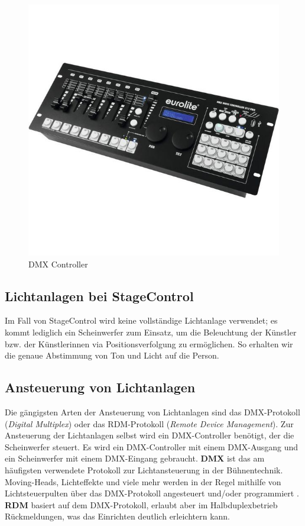 \begin{figure}[H]
	\centering
	\includegraphics[width=0.7\linewidth]{images/DMXController.jpg}
	\caption[DMX Controller]{DMX Controller}
	\label{fig:DMXController}
\end{figure}

\subsection{Lichtanlagen bei StageControl}
Im Fall von StageControl wird keine vollständige Lichtanlage verwendet; es kommt lediglich ein Scheinwerfer zum Einsatz, um die Beleuchtung der Künstler bzw. der Künstlerinnen via Positionsverfolgung zu ermöglichen. So erhalten wir die genaue Abstimmung von Ton und Licht auf die Person.

\newpage
\subsection{Ansteuerung von Lichtanlagen}

Die gängigsten Arten der Ansteuerung von Lichtanlagen sind das DMX-Protokoll (\textit{Digital Multiplex}) oder das RDM-Protokoll (\textit{Remote Device Management}). Zur Ansteuerung der Lichtanlagen selbst wird ein DMX-Controller benötigt, der die Scheinwerfer steuert. Es wird ein DMX-Controller mit einem DMX-Ausgang und ein Scheinwerfer mit einem DMX-Eingang gebraucht.
\textbf{DMX} ist das am häufigsten verwendete Protokoll zur Lichtansteuerung in der Bühnentechnik. Moving-Heads, Lichteffekte und viele mehr werden in der Regel mithilfe von Lichtsteuerpulten über das DMX-Protokoll angesteuert und/oder programmiert \parencite{LichtanlageRDMDMX}.
\textbf{RDM} basiert auf dem DMX-Protokoll, erlaubt aber im Halbduplexbetrieb Rückmeldungen, was das Einrichten deutlich erleichtern kann.\\


